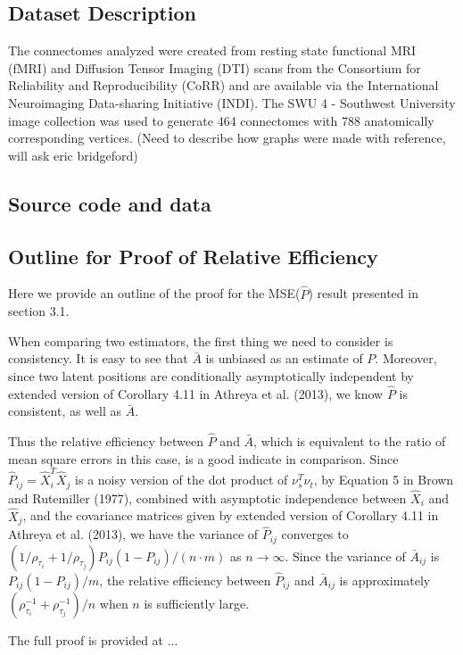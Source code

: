 	\subsection{Dataset Description}
	The connectomes analyzed were created from resting state functional MRI (fMRI) and Diffusion Tensor Imaging (DTI) scans from the Consortium for Reliability and Reproducibility (CoRR) and are available via the International Neuroimaging Data-sharing Initiative (INDI).  The SWU 4 - Southwest University image collection was used to generate 464 connectomes with 788 anatomically corresponding vertices.  (Need to describe how graphs were made with reference, will ask eric bridgeford)
	\subsection{Source code and data}
	\subsection{Outline for Proof of Relative Efficiency}
	Here we provide an outline of the proof for the MSE($\hat{P}$) result presented in section 3.1.
	
	When comparing two estimators, the first thing we need to consider is consistency.
	It is easy to see that $\bar{A}$ is unbiased as an estimate of $P$. Moreover, since two latent positions are conditionally asymptotically independent by extended version of Corollary 4.11 in Athreya et al. (2013), we know $\hat{P}$ is consistent, as well as $\bar{A}$.
	
	Thus the relative efficiency between $\hat{P}$ and $\bar{A}$, which is equivalent to the ratio of mean square errors in this case, is a good indicate in comparison.
	Since $\hat{P}_{ij} = \hat{X}_i^T \hat{X}_j$ is a noisy version of the dot product of $\nu_s^T \nu_t$, by Equation 5 in Brown and Rutemiller (1977), combined with asymptotic independence between $\hat{X}_i$ and $\hat{X}_j$, and the covariance matrices given by extended version of Corollary 4.11 in Athreya et al. (2013), we have the variance of $\hat{P}_{ij}$ converges to $\left( 1/\rho_{\tau_i} + 1/\rho_{\tau_j} \right) P_{ij} (1-P_{ij})/(n \cdot m)$ as $n \rightarrow \infty$. Since the variance of $\bar{A}_{ij}$ is $P_{ij} (1-P_{ij})/m$, the relative efficiency between $\hat{P}_{ij}$ and $\bar{A}_{ij}$ is approximately $(\rho_{\tau_i}^{-1} + \rho_{\tau_j}^{-1})/n$ when $n$ is sufficiently large.
	
	The full proof is provided at ...